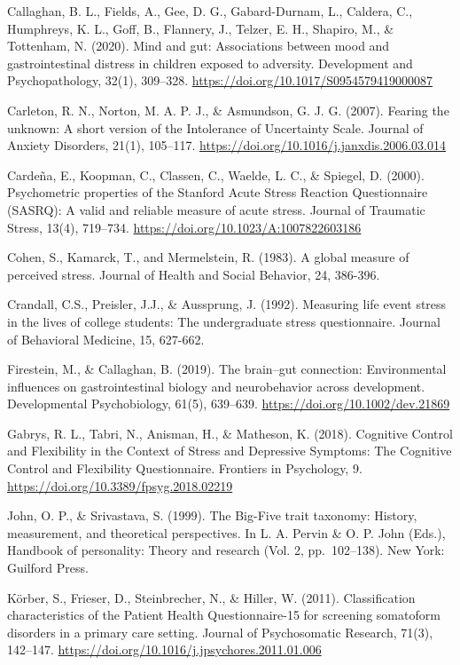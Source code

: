 \documentclass[]{book}
\begin{document}
Callaghan, B. L., Fields, A., Gee, D. G., Gabard-Durnam, L., Caldera, C., Humphreys, K. L., Goff, B., Flannery, J., Telzer, E. H., Shapiro, M., \& Tottenham, N. (2020). Mind and gut: Associations between mood and gastrointestinal distress in children exposed to adversity. Development and Psychopathology, 32(1), 309--328. \url{https://doi.org/10.1017/S0954579419000087}

Carleton, R. N., Norton, M. A. P. J., \& Asmundson, G. J. G. (2007). Fearing the unknown: A short version of the Intolerance of Uncertainty Scale. Journal of Anxiety Disorders, 21(1), 105--117. \url{https://doi.org/10.1016/j.janxdis.2006.03.014}

Cardeña, E., Koopman, C., Classen, C., Waelde, L. C., \& Spiegel, D. (2000). Psychometric properties of the Stanford Acute Stress Reaction Questionnaire (SASRQ): A valid and reliable measure of acute stress. Journal of Traumatic Stress, 13(4), 719--734. \url{https://doi.org/10.1023/A:1007822603186}

Cohen, S., Kamarck, T., and Mermelstein, R. (1983). A global measure of perceived stress. Journal of Health and Social Behavior, 24, 386-396.

Crandall, C.S., Preisler, J.J., \& Aussprung, J. (1992). Measuring life event stress in the lives of college students: The undergraduate stress questionnaire. Journal of Behavioral Medicine, 15, 627-662.

Firestein, M., \& Callaghan, B. (2019). The brain--gut connection: Environmental influences on gastrointestinal biology and neurobehavior across development. Developmental Psychobiology, 61(5), 639--639. \url{https://doi.org/10.1002/dev.21869}

Gabrys, R. L., Tabri, N., Anisman, H., \& Matheson, K. (2018). Cognitive Control and Flexibility in the Context of Stress and Depressive Symptoms: The Cognitive Control and Flexibility Questionnaire. Frontiers in Psychology, 9. \url{https://doi.org/10.3389/fpsyg.2018.02219}

John, O. P., \& Srivastava, S. (1999). The Big-Five trait taxonomy: History, measurement, and theoretical perspectives. In L. A. Pervin \& O. P. John (Eds.), Handbook of personality: Theory and research (Vol. 2, pp.~102--138). New York: Guilford Press.

Körber, S., Frieser, D., Steinbrecher, N., \& Hiller, W. (2011). Classification characteristics of the Patient Health Questionnaire-15 for screening somatoform disorders in a primary care setting. Journal of Psychosomatic Research, 71(3), 142--147. \url{https://doi.org/10.1016/j.jpsychores.2011.01.006}
\end{document}
